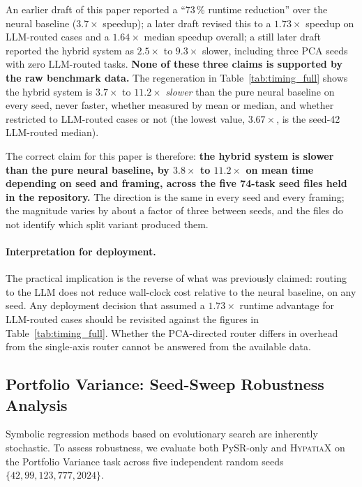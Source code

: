 \documentclass[twoside,11pt]{article}
\begin{document}
An earlier draft of this paper reported a ``73\,\% runtime reduction'' over
the neural baseline ($3.7\times$ speedup); a later draft revised this to a
$1.73\times$ speedup on LLM-routed cases and a $1.64\times$ median speedup
overall; a still later draft reported the hybrid system as $2.5\times$ to
$9.3\times$ slower, including three PCA seeds with zero LLM-routed tasks.
\textbf{None of these three claims is supported by the raw benchmark
data.} The regeneration in Table~\ref{tab:timing_full}
shows the hybrid system is $3.7\times$ to $11.2\times$ \emph{slower} than
the pure neural baseline on every seed, never faster,
whether measured by mean or median, and whether restricted to LLM-routed
cases or not (the lowest value, $3.67\times$, is the seed-42 LLM-routed median).

The correct claim for this paper is therefore: \textbf{the hybrid system
is slower than the pure neural baseline, by $3.8\times$ to $11.2\times$ on mean
time depending on seed and framing, across the five 74-task seed files
held in the repository.} The direction is the same in every seed and every
framing; the magnitude varies by about a factor of three between seeds, and
the files do not identify which split variant produced them.

\paragraph{Interpretation for deployment.}
The practical implication is the reverse of what was previously claimed:
routing to the LLM does not reduce wall-clock cost relative to the neural
baseline, on any seed. Any deployment decision that
assumed a $1.73\times$ runtime advantage for LLM-routed cases should be
revisited against the figures in Table~\ref{tab:timing_full}. Whether the
PCA-directed router differs in overhead from the single-axis router cannot be
answered from the available data.


\subsection{Portfolio Variance: Seed-Sweep Robustness Analysis}\label{subsec:portfolio-variance-seedsweep-robustness-}
\label{sec:portfolio_seed_sweep}

Symbolic regression methods based on evolutionary search are inherently stochastic.
To assess robustness, we evaluate both PySR-only and \textsc{HypatiaX} on the
Portfolio Variance task across five independent random seeds
$\{42, 99, 123, 777, 2024\}$.
\end{document}
